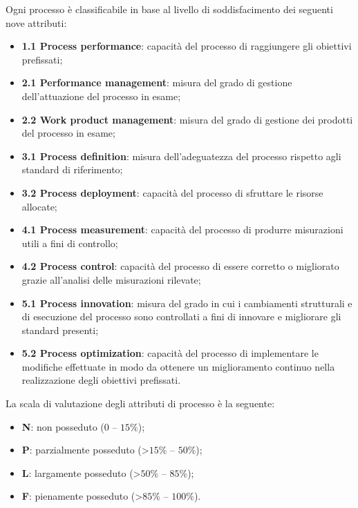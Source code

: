 Ogni processo è classificabile in base al livello di soddisfacimento dei seguenti nove attributi:
\begin{itemize}
\item \textbf{1.1 Process performance}: capacità del processo di raggiungere gli obiettivi prefissati;
\item \textbf{2.1 Performance management}: misura del grado di gestione dell'attuazione del processo in esame;
\item \textbf{2.2 Work product management}: misura del grado di gestione dei prodotti del processo in esame;
\item \textbf{3.1 Process definition}: misura dell'adeguatezza del processo rispetto agli standard di riferimento;
\item \textbf{3.2 Process deployment}: capacità del processo di sfruttare le risorse allocate;
\item \textbf{4.1 Process measurement}: capacità del processo di produrre misurazioni utili a fini di controllo;
\item \textbf{4.2 Process control}: capacità del processo di essere corretto o migliorato grazie all'analisi delle misurazioni rilevate;
\item \textbf{5.1 Process innovation}: misura del grado in cui i cambiamenti strutturali e di esecuzione del processo sono controllati a fini di innovare e migliorare gli standard presenti;
\item \textbf{5.2 Process optimization}: capacità del processo di implementare le modifiche effettuate in modo da ottenere un miglioramento continuo nella realizzazione degli obiettivi prefissati.
\end{itemize}

La scala di valutazione degli attributi di processo è la seguente:
\begin{itemize}
\item \textbf{N}: non posseduto ($0$ -- $15\%$);
\item \textbf{P}: parzialmente posseduto (\textgreater $15\%$ -- $50\%$);
\item \textbf{L}: largamente posseduto (\textgreater $50\%$ -- $85\%$);
\item \textbf{F}: pienamente posseduto (\textgreater $85\%$ -- $100\%$).
\end{itemize}

